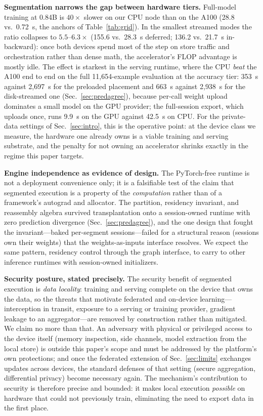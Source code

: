\documentclass[journal]{IEEEtran}
\begin{document}
\textbf{Segmentation narrows the gap between hardware tiers.} Full-model training at 0.84B is $40\times$ slower on our CPU node than on
the A100 (28.8 vs.\ 0.72~s, the anchors of Table~\ref{tab:grid}). In the smallest streamed modes the ratio collapses to $5.5$--$6.3\times$
(155.6 vs.\ 28.3~s deferred; 136.2 vs.\ 21.7~s in-backward): once both devices spend most of the step on store traffic
and orchestration rather than dense math, the accelerator's FLOP advantage
is mostly idle. The effect is starkest in the serving runtime, where the
CPU \emph{beat} the A100 end to end on the full 11{,}654-example
evaluation at the accuracy tier: 353~s against 2{,}697~s for the
preloaded placement and 663~s against 2{,}938~s for the disk-streamed one
(Sec.~\ref{sec:predagree}), because per-call weight upload dominates a
small model on the GPU provider; the full-session export, which uploads
once, runs 9.9~s on the GPU against 42.5~s on CPU. For the private-data settings of
Sec.~\ref{sec:intro}, this is the operative point: at the device class we
measure, the hardware one already owns is a viable training and serving
substrate, and the penalty
for not owning an accelerator shrinks exactly in the regime this paper
targets.

\textbf{Engine independence as evidence of design.} The PyTorch-free
runtime is not a deployment convenience only; it is a falsifiable test of
the claim that segmented execution is a property of the \emph{computation}
rather than of a framework's autograd and allocator. The partition,
residency invariant, and reassembly algebra survived transplantation onto
a session-owned runtime with zero prediction divergence
(Sec.~\ref{sec:predagree}), and the one design that fought the
invariant---baked per-segment sessions---failed for a structural reason
(sessions own their weights) that the weights-as-inputs interface
resolves. We expect the same pattern, residency control through the graph
interface, to carry to other inference runtimes with session-owned
initializers.

\textbf{Security posture, stated precisely.} The security benefit of
segmented execution is \emph{data locality}: training and serving complete
on the device that owns the data, so the threats that motivate federated
and on-device learning---interception in transit, exposure to a serving or
training provider, gradient leakage to an aggregator---are removed by
construction rather than mitigated. We claim no more than that. An
adversary with physical or privileged access to the device itself (memory
inspection, side channels, model extraction from the local store) is
outside this paper's scope and must be addressed by the platform's own
protections; and once the federated extension of Sec.~\ref{sec:limits}
exchanges updates across devices, the standard defenses of that setting
(secure aggregation, differential privacy) become necessary again. The
mechanism's contribution to security is therefore precise and bounded: it
makes local execution \emph{possible} on hardware that could not
previously train, eliminating the need to export data in the first place.
\end{document}
